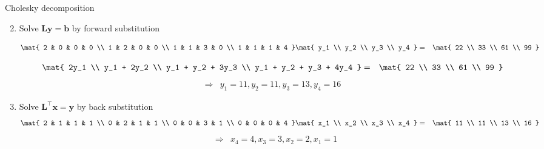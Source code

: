 \documentclass[11pt,compress,t,notes=noshow, xcolor=table]{beamer}
\begin{document}
\begin{vbframe}{Cholesky decomposition}
\begin{enumerate}
\setcounter{enumi}{1}

\item Solve $\mathbf{Ly} = \mathbf{b}$ by forward substitution


\begin{eqnarray*}
\mat{
  2 & 0 & 0 & 0 \\
  1 & 2 & 0 & 0 \\
  1 & 1 & 3 & 0 \\
  1 & 1 & 1 & 4 }
\mat{
  y_1 \\
  y_2 \\
  y_3 \\
  y_4 }
&=& \mat{
  22 \\
  33 \\
  61 \\
  99 } \\
\end{eqnarray*}

\vspace*{-0.5cm}

\begin{eqnarray*}
\mat{
  2y_1 \\
  y_1 + 2y_2 \\
  y_1 + y_2 + 3y_3 \\
  y_1 + y_2 + y_3 + 4y_4 }
&=& \mat{
  22 \\
  33 \\
  61 \\
  99 } \\
\end{eqnarray*}
\begin{eqnarray*}
\Rightarrow&  y_1 = 11, y_2 = 11, y_3 = 13, y_4 = 16
\end{eqnarray*}

\normalsize
\framebreak
\medskip
\item Solve $\mathbf{L}^\top \mathbf{x}=\mathbf{y}$ by back substitution
\begin{eqnarray*}
\mat{
2 & 1 & 1 & 1 \\
0 & 2 & 1 & 1 \\
0 & 0 & 3 & 1 \\
0 & 0 & 0 & 4 }
\mat{
x_1 \\
x_2 \\
x_3 \\
x_4 }
&=& \mat{
11 \\
11 \\
13 \\
16 } \\
\end{eqnarray*}
\begin{eqnarray*}
&\Rightarrow& x_4 = 4, x_3 = 3, x_2 = 2, x_1 = 1
\end{eqnarray*}
\end{enumerate}
\framebreak


\end{vbframe}
\end{document}
